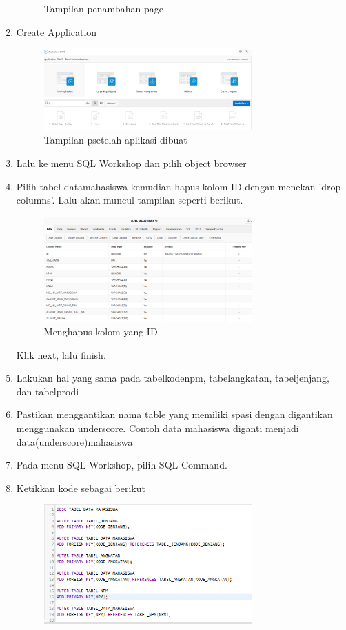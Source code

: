 \begin{enumerate}
\begin{figure}[H]
				\centering
				\caption{Tampilan penambahan page}
				\end{figure}
	\item Create Application
				\begin{figure}[H]
				\includegraphics[width=8cm]{figures/setelah.png}
				\centering
				\caption{Tampilan psetelah aplikasi dibuat}
				\end{figure}
	\item Lalu ke menu SQL Workshop dan pilih object browser
	\item Pilih tabel datamahasiswa kemudian hapus kolom ID dengan menekan 'drop columns'. Lalu akan muncul tampilan seperti berikut.
				\begin{figure}[H]
				\includegraphics[width=8cm]{figures/datati.png}
				\centering
				\caption{Menghapus kolom yang ID}
				\end{figure}
	Klik next, lalu finish.
	\item Lakukan hal yang sama pada tabelkodenpm, tabelangkatan, tabeljenjang, dan tabelprodi
	\item Pastikan menggantikan nama table yang memiliki spasi dengan digantikan menggunakan underscore. Contoh data mahasiswa diganti menjadi data(underscore)mahasiswa
	\item Pada menu SQL Workshop, pilih SQL Command.
	\item Ketikkan kode sebagai berikut\\
	            \begin{figure}[H]
				\includegraphics[width=8cm]{figures/kode.PNG}

\end{figure}
\end{enumerate}
